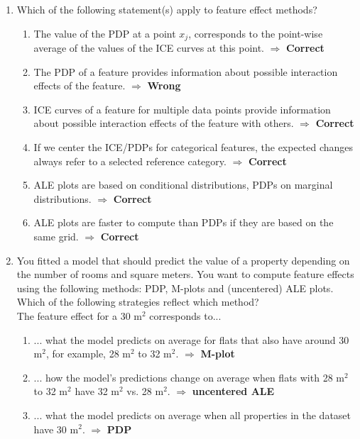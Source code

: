 \documentclass[a4paper]{article}
\begin{document}
{\begin{enumerate}
\item Which of the following statement(s) apply to feature effect methods? 
        \begin{enumerate}
        \item The value of the PDP at a point $x_j$, corresponds to the point-wise average of the values of the ICE curves at this point. $\Rightarrow$ \textbf{Correct}
        \item The PDP of a feature provides information about possible interaction effects of the feature. $\Rightarrow$ \textbf{Wrong}
        \item ICE curves of a feature for multiple data points provide information about possible interaction effects of the feature with others. $\Rightarrow$ \textbf{Correct}
        \item If we center the ICE/PDPs for categorical features, the expected changes always refer to a selected reference category. $\Rightarrow$ \textbf{Correct}
        \item ALE plots are based on conditional distributions, PDPs on marginal distributions. $\Rightarrow$ \textbf{Correct}
        \item ALE plots are faster to compute than PDPs if they are based on the same grid. $\Rightarrow$ \textbf{Correct}
        \end{enumerate}
\item You fitted a model that should predict the value of a property depending on 
    the number of rooms and square meters. 
    You want to compute feature effects using the following methods: 
    PDP, M-plots and (uncentered) ALE plots. 
    Which of the following strategies reflect which method? \\
    The feature effect for a 30 m$^2$ corresponds to... 
\begin{enumerate}
  \item ... what the model predicts on average for flats that also have around 30 m$^2$, for example, 28 m$^2$ to 32 m$^2$. $\Rightarrow$ \textbf{M-plot}
  \item ... how the model's predictions change on average when flats with 28 m$^2$ to 32 m$^2$ have 32 m$^2$ vs. 28 m$^2$. $\Rightarrow$ \textbf{uncentered ALE}
  \item ... what the model predicts on average when all properties in the dataset have 30 m$^2$. $\Rightarrow$ \textbf{PDP}
\end{enumerate}

\end{enumerate}
}
\end{document}
